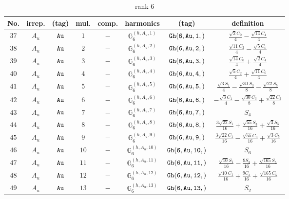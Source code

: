 \documentclass[fleqn,8pt]{jsarticle}
\begin{document}
\begin{table}[ht!]
\begin{center}
\caption{rank 6}
\renewcommand{\arraystretch}{1.3}
\begin{tabular}{cccccccc} \hline \hline
No. & irrep. & (tag) & mul. & comp. & harmonics & (tag) & definition \\ \hline
$ 37 $ & $ A_{u} $ & $ {\tt Au} $ & $ 1 $ & $ - $ & $ \mathbb{G}_{6}^{(h,A_{u},1)} $ & $ {\tt Gh(6,Au,1,)} $ & $ \frac{\sqrt{2} C_{0}}{4} - \frac{\sqrt{14} C_{4}}{4} $ \\
$ 38 $ & $ A_{u} $ & $ {\tt Au} $ & $ 2 $ & $ - $ & $ \mathbb{G}_{6}^{(h,A_{u},2)} $ & $ {\tt Gh(6,Au,2,)} $ & $ \frac{\sqrt{11} C_{2}}{4} - \frac{\sqrt{5} C_{6}}{4} $ \\
$ 39 $ & $ A_{u} $ & $ {\tt Au} $ & $ 3 $ & $ - $ & $ \mathbb{G}_{6}^{(h,A_{u},3)} $ & $ {\tt Gh(6,Au,3,)} $ & $ \frac{\sqrt{14} C_{0}}{4} + \frac{\sqrt{2} C_{4}}{4} $ \\
$ 40 $ & $ A_{u} $ & $ {\tt Au} $ & $ 4 $ & $ - $ & $ \mathbb{G}_{6}^{(h,A_{u},4)} $ & $ {\tt Gh(6,Au,4,)} $ & $ \frac{\sqrt{5} C_{2}}{4} + \frac{\sqrt{11} C_{6}}{4} $ \\
$ 41 $ & $ A_{u} $ & $ {\tt Au} $ & $ 5 $ & $ - $ & $ \mathbb{G}_{6}^{(h,A_{u},5)} $ & $ {\tt Gh(6,Au,5,)} $ & $ \frac{\sqrt{3} S_{1}}{4} - \frac{\sqrt{30} S_{3}}{8} - \frac{\sqrt{22} S_{5}}{8} $ \\
$ 42 $ & $ A_{u} $ & $ {\tt Au} $ & $ 6 $ & $ - $ & $ \mathbb{G}_{6}^{(h,A_{u},6)} $ & $ {\tt Gh(6,Au,6,)} $ & $ - \frac{\sqrt{3} C_{1}}{4} - \frac{\sqrt{30} C_{3}}{8} + \frac{\sqrt{22} C_{5}}{8} $ \\
$ 43 $ & $ A_{u} $ & $ {\tt Au} $ & $ 7 $ & $ - $ & $ \mathbb{G}_{6}^{(h,A_{u},7)} $ & $ {\tt Gh(6,Au,7,)} $ & $ S_{4} $ \\
$ 44 $ & $ A_{u} $ & $ {\tt Au} $ & $ 8 $ & $ - $ & $ \mathbb{G}_{6}^{(h,A_{u},8)} $ & $ {\tt Gh(6,Au,8,)} $ & $ \frac{3 \sqrt{22} S_{1}}{16} + \frac{\sqrt{55} S_{3}}{16} + \frac{\sqrt{3} S_{5}}{16} $ \\
$ 45 $ & $ A_{u} $ & $ {\tt Au} $ & $ 9 $ & $ - $ & $ \mathbb{G}_{6}^{(h,A_{u},9)} $ & $ {\tt Gh(6,Au,9,)} $ & $ \frac{3 \sqrt{22} C_{1}}{16} - \frac{\sqrt{55} C_{3}}{16} + \frac{\sqrt{3} C_{5}}{16} $ \\
$ 46 $ & $ A_{u} $ & $ {\tt Au} $ & $ 10 $ & $ - $ & $ \mathbb{G}_{6}^{(h,A_{u},10)} $ & $ {\tt Gh(6,Au,10,)} $ & $ S_{6} $ \\
$ 47 $ & $ A_{u} $ & $ {\tt Au} $ & $ 11 $ & $ - $ & $ \mathbb{G}_{6}^{(h,A_{u},11)} $ & $ {\tt Gh(6,Au,11,)} $ & $ \frac{\sqrt{10} S_{1}}{16} - \frac{9 S_{3}}{16} + \frac{\sqrt{165} S_{5}}{16} $ \\
$ 48 $ & $ A_{u} $ & $ {\tt Au} $ & $ 12 $ & $ - $ & $ \mathbb{G}_{6}^{(h,A_{u},12)} $ & $ {\tt Gh(6,Au,12,)} $ & $ \frac{\sqrt{10} C_{1}}{16} + \frac{9 C_{3}}{16} + \frac{\sqrt{165} C_{5}}{16} $ \\
$ 49 $ & $ A_{u} $ & $ {\tt Au} $ & $ 13 $ & $ - $ & $ \mathbb{G}_{6}^{(h,A_{u},13)} $ & $ {\tt Gh(6,Au,13,)} $ & $ S_{2} $ \\
 \hline \hline
\end{tabular}
\end{center}
\end{table}
\end{document}
